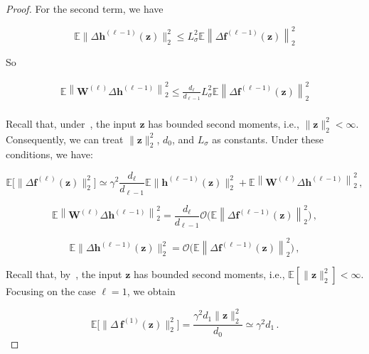 \begin{proof}
For the second term, we have

\begin{equation*}
    \mathbb{E}\|\Delta \mathbf{h}^{(\ell-1)}(\mathbf{z})\|_2^2 \leq L_{\sigma}^2 \mathbb{E}\left \| \Delta \mathbf{f}^{(\ell-1)}(\mathbf{z}) \right \|_2^2
\end{equation*}

So

\begin{equation*}
\begin{split}
    \mathbb{E}\left \| \mathbf{W}^{(\ell)} \Delta \mathbf{h}^{(\ell-1)} \right \|_2^2 \leq \frac{d_{\ell}}{d_{\ell-1}} L_{\sigma}^2 \mathbb{E}\left \| \Delta \mathbf{f}^{(\ell-1)}(\mathbf{z}) \right \|_2^2\\
\end{split} 
\end{equation*}


Recall that, under~, the input $\mathbf{z}$ has bounded
second moments, i.e., $\|\mathbf{z}\|_2^2 < \infty$. Consequently, we can treat 
$\|\mathbf{z}\|_2^2$, $d_0$, and $L_{\sigma}$ as constants. Under these conditions, we have:

\begin{equation*}
    \mathbb{E}\bigl[\|\Delta \mathbf{f}^{(\ell)}(\mathbf{z})\|_2^2\bigr] \simeq \gamma^2 \frac{d_{\ell}}{d_{\ell-1}} \mathbb{E}\|\mathbf{h}^{(\ell-1)}(\mathbf{z})\|_2^2 + \mathbb{E}\left \| \mathbf{W}^{(\ell)} \Delta \mathbf{h}^{(\ell-1)} \right \|_2^2\,,
\end{equation*}

\begin{equation*}
    \mathbb{E}\left \| \mathbf{W}^{(\ell)} \Delta \mathbf{h}^{(\ell-1)} \right \|_2^2 =\frac{d_{\ell}}{d_{\ell-1}} \mathcal{O}\bigg(\mathbb{E}\left \| \Delta \mathbf{f}^{(\ell-1)}(\mathbf{z}) \right \|_2^2\bigg)\,,
\end{equation*}

\begin{equation*}
    \mathbb{E}\|\Delta \mathbf{h}^{(\ell-1)}(\mathbf{z})\|_2^2 =\mathcal{O}\bigg( \mathbb{E}\left \| \Delta \mathbf{f}^{(\ell-1)}(\mathbf{z}) \right \|_2^2\bigg)\,,
\end{equation*}

Recall that, by~, the input $\mathbf{z}$ has bounded
second moments, i.e., $\mathbb{E}[\|\mathbf{z}\|_2^2] < \infty$. 
Focusing on the case $\ell = 1$, we obtain

\begin{equation*}
\mathbb{E}\bigl[\|\Delta\,\mathbf{f}^{(1)}(\mathbf{z})\|_2^2\bigr] =  \frac{\gamma^2 d_1 \|\mathbf{z}\|_2^2}{d_0} \simeq \gamma^2 d_1\,.
\end{equation*}


\end{proof}
